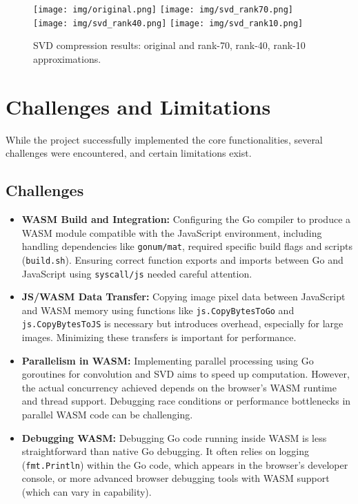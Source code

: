 \documentclass{article}
\begin{document}
\begin{itemize}
\begin{figure}[H]
            \centering
            \texttt{[image: img/original.png]}
            \hspace{0.5em}
            \texttt{[image: img/svd\_rank70.png]}
            \hspace{0.5em}
            \texttt{[image: img/svd\_rank40.png]}
            \hspace{0.5em}
            \texttt{[image: img/svd\_rank10.png]}
            \caption{SVD compression results: original and rank-70, rank-40, rank-10 approximations.}
            \label{fig:svd_results_impl}
        \end{figure}
\end{itemize}

\section{Challenges and Limitations}
\label{sec:challenges}
While the project successfully implemented the core functionalities, several challenges were encountered, and certain limitations exist.

\subsection{Challenges}
\begin{itemize}
    \item \textbf{WASM Build and Integration:} Configuring the Go compiler to produce a WASM module compatible with the JavaScript environment, including handling dependencies like \texttt{gonum/mat}, required specific build flags and scripts (\texttt{build.sh}). Ensuring correct function exports and imports between Go and JavaScript using \texttt{syscall/js} needed careful attention.
    \item \textbf{JS/WASM Data Transfer:} Copying image pixel data between JavaScript and WASM memory using functions like \texttt{js.CopyBytesToGo} and \texttt{js.CopyBytesToJS} is necessary but introduces overhead, especially for large images. Minimizing these transfers is important for performance.
    \item \textbf{Parallelism in WASM:} Implementing parallel processing using Go goroutines for convolution and SVD aims to speed up computation. However, the actual concurrency achieved depends on the browser's WASM runtime and thread support. Debugging race conditions or performance bottlenecks in parallel WASM code can be challenging.
    \item \textbf{Debugging WASM:} Debugging Go code running inside WASM is less straightforward than native Go debugging. It often relies on logging (\texttt{fmt.Println}) within the Go code, which appears in the browser's developer console, or more advanced browser debugging tools with WASM support (which can vary in capability).
\end{itemize}
\end{document}
